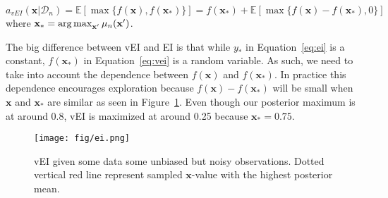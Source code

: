 \begin{definition}[vEI]
    \begin{equation}
        \label{eq:vei}
        a_{vEI}(\mathbf{x} | \mathcal{D}_n) = \mathbb{E}[\max \{ f(\mathbf{x}), f(\mathbf{x}_*) \}]
        = f(\mathbf{x}_*) + \mathbb{E}[\max \{ f(\mathbf{x}) - f(\mathbf{x}_*), 0 \}]
    \end{equation}
    where $\mathbf{x}_* = \operatorname*{arg\,max}_{\mathbf{x'}} \mu_n(\mathbf{x'})$.
\end{definition}

The big difference between vEI and EI is that while $y_*$ in Equation~\ref{eq:ei} is a constant, $f(\mathbf{x}_*)$ in Equation~\ref{eq:vei} is a random variable.
As such, we need to take into account the dependence between $f(\mathbf{x})$ and $f(\mathbf{x}_*)$.
In practice this dependence encourages exploration because $f(\mathbf{x}) - f(\mathbf{x}_*)$ will be small when $\mathbf{x}$ and $\mathbf{x}_*$ are similar as seen in Figure~\ref{fig:ei}.
Even though our posterior maximum is at around 0.8, vEI is maximized at around 0.25 because $\mathbf{x}_* = 0.75$.

\begin{figure}[h]
    \centering
    \texttt{[image: fig/ei.png]}
    \caption{vEI given some data some unbiased but noisy observations.
        Dotted vertical red line represent sampled $\mathbf{x}$-value with the highest posterior mean.
    }
    \label{fig:ei}
\end{figure}

